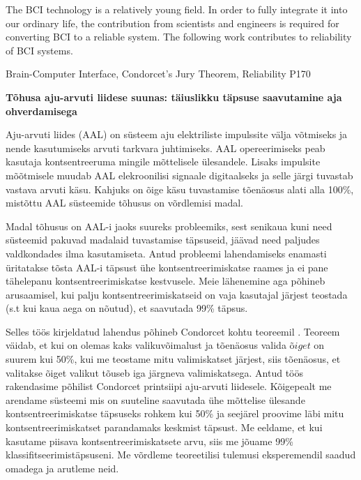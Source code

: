 \documentclass[12pt]{article}
\theoremstyle{definition}
\begin{document}
The BCI technology is a relatively young field. In order to fully integrate it into our ordinary life, the contribution from scientists and engineers is required for converting BCI to a reliable system. The following work contributes to reliability of BCI systems.


\vspace*{3ex}
{}
Brain-Computer Interface, Condorcet's Jury Theorem, Reliability
{}
P170
\vspace*{3ex}

\newpage
{}
\noindent\textbf{\large Tõhusa aju-arvuti liidese suunas: täiuslikku täpsuse saavutamine aja ohverdamisega}
\vspace*{2ex}
{ }

Aju-arvuti liides (AAL) on süsteem aju elektriliste impulssite välja võtmiseks ja nende kasutumiseks arvuti tarkvara juhtimiseks. AAL opereerimiseks peab kasutaja kontsentreeruma mingile mõttelisele ülesandele. Lisaks impulsite mõõtmisele muudab AAL elekroonilisi signaale digitaalseks ja selle järgi tuvastab vastava arvuti käsu. Kahjuks on õige käsu tuvastamise tõenäosus alati alla
100\%, mistõttu  AAL süsteemide tõhusus on võrdlemisi madal.

Madal tõhusus on AAL-i jaoks suureks probleemiks, sest senikaua kuni need süsteemid pakuvad madalaid tuvastamise täpsuseid, jäävad need paljudes valdkondades ilma kasutamiseta. Antud probleemi lahendamiseks enamasti üritatakse tõsta AAL-i täpsust ühe kontsentreerimiskatse raames ja ei pane tähelepanu kontsentreerimiskatse kestvusele. Meie lähenemine aga põhineb arusaamisel, kui palju kontsentreerimiskatseid on vaja kasutajal järjest teostada (s.t kui kaua aega on nõutud), et saavutada 99\% täpsus.

Selles töös kirjeldatud lahendus põhineb Condorcet kohtu teoreemil \cite{condorcets}. Teoreem väidab, et kui on olemas kaks valikuvõimalust ja tõenäosus valida $õiget$ on suurem kui 50\%, kui me teostame mitu valimiskatset järjest, siis tõenäosus, et valitakse õiget valikut tõuseb iga järgneva valimiskatsega. 
Antud töös rakendasime põhilist Condorcet printsiipi aju-arvuti liidesele. Kõigepealt me arendame süsteemi mis on suuteline saavutada ühe mõttelise ülesande kontsentreerimiskatse täpsuseks rohkem kui 50\% ja seejärel proovime läbi mitu kontsentreerimiskatset parandamaks keskmist täpsust. Me eeldame, et kui kasutame piisava kontsentreerimiskatsete arvu, siis me jõuame 99\% klassifitseerimistäpsuseni. Me võrdleme teoreetilisi tulemusi eksperemendil saadud omadega ja arutleme neid.
\end{document}
